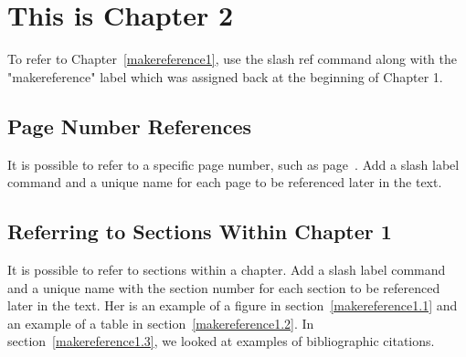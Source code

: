
\cleardoublepage


\chapter{This is Chapter 2}
\label{makereference2}

To refer to Chapter~\ref{makereference1}, use the slash ref command
along with the "makereference" label which was assigned back at the
beginning of Chapter 1.

\section{Page Number References}
\label{makereference2.1} It is possible to refer to a specific page
number, such as page~\pageref{makereference1}.  Add a slash label
command and a unique name for each page to be referenced later in
the text.

\section{Referring to Sections Within Chapter 1}
\label{makereference2.2} It is possible to refer to sections within
a chapter.  Add a slash label command and a unique name with the
section number for each section to be referenced later in the text.
Her is an example of a figure in section~\ref{makereference1.1} and
an example of a table in section~\ref{makereference1.2}.  In
section~\ref{makereference1.3}, we looked at examples of
bibliographic citations.

